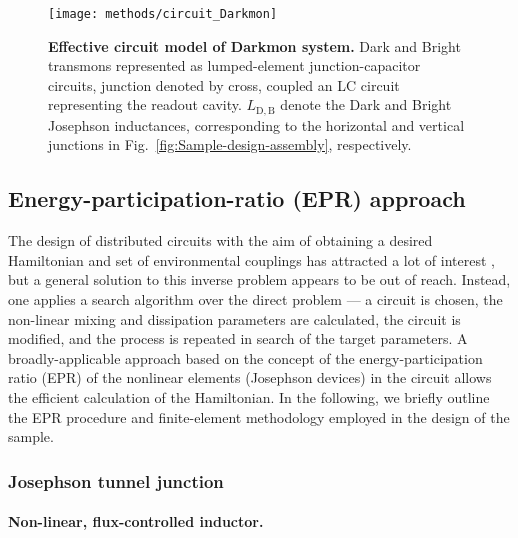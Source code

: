 \begin{figure}
\centering{}\texttt{[image: methods/circuit\_Darkmon]}
\caption[Effective circuit model of Darkmon system]{\textbf{Effective circuit model of Darkmon system.\label{fig:Darkmon-circuit}}
Dark and Bright transmons represented as lumped-element junction-capacitor
circuits, junction denoted by cross, coupled an LC circuit representing
the readout cavity. $L_{\mathrm{D,B}}$ denote the Dark and Bright
Josephson inductances, corresponding to the horizontal and vertical
junctions in Fig.~\ref{fig:Sample-design-assembly}, respectively.}
\end{figure}


\subsection{Energy-participation-ratio (EPR) approach\label{subsec:Energy-participation-ratio}}

The design of distributed circuits with the aim of obtaining a desired
Hamiltonian and set of environmental couplings has attracted a lot
of interest \citep{Nigg2012,Bourassa2012,Solgun2014,Solgun2015,Smith2016},
but a general solution to this inverse problem appears to be out of
reach. Instead, one applies a search algorithm over the direct problem
— a circuit is chosen, the non-linear mixing and dissipation parameters
are calculated, the circuit is modified, and the process is repeated
in search of the target parameters. A broadly-applicable approach
based on the concept of the energy-participation ratio (EPR) of the
nonlinear elements (Josephson devices) in the circuit allows the efficient
calculation of the Hamiltonian. In the following, we briefly outline
the EPR procedure and finite-element methodology employed in the design
of the sample.


\subsubsection{Josephson tunnel junction}

\paragraph{Non-linear, flux-controlled inductor.}

